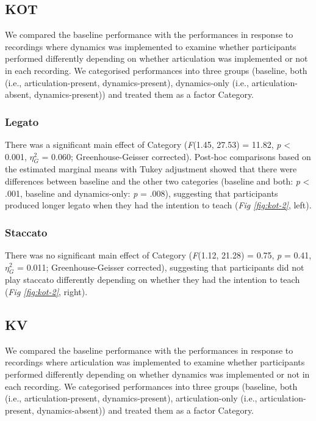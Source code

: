 \documentclass[
  man,floatsintext]{apa6}
\begin{document}
\hypertarget{kot-1}{%
\subsection{KOT}\label{kot-1}}

We compared the baseline performance with the performances in response to recordings where dynamics was implemented to examine whether participants performed differently depending on whether articulation was implemented or not in each recording. We categorised performances into three groups (baseline, both (i.e., articulation-present, dynamics-present), dynamics-only (i.e., articulation-absent, dynamics-present)) and treated them as a factor Category.

\hypertarget{legato-1}{%
\subsubsection{Legato}\label{legato-1}}

There was a significant main effect of Category (\emph{F}(1.45, 27.53) = 11.82, \emph{p} \textless{} 0.001, \(\eta_G^2\) = 0.060; Greenhouse-Geisser corrected). Post-hoc comparisons based on the estimated marginal means with Tukey adjustment showed that there were differences between baseline and the other two categories (baseline and both: \emph{p} \textless{} .001, baseline and dynamics-only: \emph{p} = .008), suggesting that participants produced longer legato when they had the intention to teach (\emph{Fig \ref{fig:kot-2}}, left).

\hypertarget{staccato-1}{%
\subsubsection{Staccato}\label{staccato-1}}

There was no significant main effect of Category (\emph{F}(1.12, 21.28) = 0.75, \emph{p} = 0.41, \(\eta_G^2\) = 0.011; Greenhouse-Geisser corrected), suggesting that participants did not play staccato differently depending on whether they had the intention to teach (\emph{Fig \ref{fig:kot-2}}, right).

\hypertarget{kv-1}{%
\subsection{KV}\label{kv-1}}

We compared the baseline performance with the performances in response to recordings where articulation was implemented to examine whether participants performed differently depending on whether dynamics was implemented or not in each recording. We categorised performances into three groups (baseline, both (i.e., articulation-present, dynamics-present), articulation-only (i.e., articulation-present, dynamics-absent)) and treated them as a factor Category.
\end{document}
